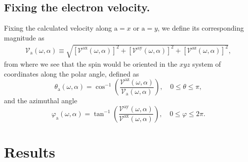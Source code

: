 \documentclass[floatfix,prb,aps,superscriptaddress,showpacs,11pt,preprint,letterpaper]{revtex4}
\begin{document}
\subsection{Fixing the electron velocity.}\label{sec:theory-fixvel}

Fixing the calculated velocity along $\mathrm{a}=x$ or $\mathrm{a}=y$, we
define its corresponding magnitude as
\begin{align}
\mathcal{V}_{\mathrm{a}}(\omega,\alpha) \equiv 
\sqrt { 
[\mathcal{V}^{\mathrm{ax}}(\omega,\alpha)]^{2} +
[\mathcal{V}^{\mathrm{ay}}(\omega,\alpha)]^{2} +
[\mathcal{V}^{\mathrm{az}}(\omega,\alpha)]^{2} 
},
\label{eq:vv-mag}
\end{align}
from where we see that the spin would be oriented in the $xyz$ system of
coordinates along the polar angle, defined as
\begin{equation}
\theta_{\mathrm{a}}  (\omega,\alpha) = 
\cos^{-1} \left( \frac{\mathcal{V}^{\mathrm{az}}(\omega,\alpha)}
{\mathcal{V}_{\mathrm{a}}(\omega,\alpha)} \right),
 \quad 0 \leq \theta \leq \pi, 
\label{eq:polar-ang}
\end{equation}
and the azimuthal angle
\begin{equation}
\varphi_{\mathrm{a}} (\omega,\alpha) =
\tan^{-1} \left( \frac{\mathcal{V}^{\mathrm{ay}}(\omega,\alpha)}
{\mathcal{V}^{\mathrm{ax}}(\omega,\alpha)} \right),
\quad 0 \leq \varphi \leq 2\pi.
\label{eq:azimuthal-ang} 
\end{equation} 

\section{Results}
\label{sec:results}
\end{document}
